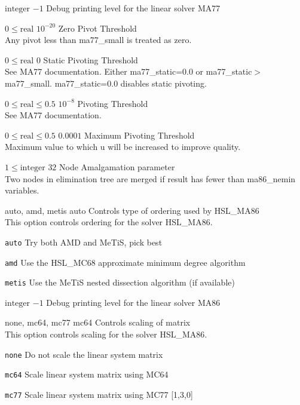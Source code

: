 %
{$\textrm{integer}$}%
{$-1$}%
{Debug printing level for the linear solver MA77}%
{}

%
{$0\leq\textrm{real}$}%
{$10^{-20}$}%
{Zero Pivot Threshold\\
Any pivot less than ma77\_small is treated as zero.}%
{}

%
{$0\leq\textrm{real}$}%
{$0$}%
{Static Pivoting Threshold\\
See MA77 documentation. Either ma77\_static=0.0 or ma77\_static$>$ma77\_small. ma77\_static=0.0 disables static pivoting.}%
{}

%
{$0\leq\textrm{real}\leq0.5$}%
{$10^{- 8}$}%
{Pivoting Threshold\\
See MA77 documentation.}%
{}

%
{$0\leq\textrm{real}\leq0.5$}%
{$0.0001$}%
{Maximum Pivoting Threshold\\
Maximum value to which u will be increased to improve quality.}%
{}

%
{$1\leq\textrm{integer}$}%
{$32$}%
{Node Amalgamation parameter\\
Two nodes in elimination tree are merged if result has fewer than ma86\_nemin variables.}%
{}

%
{\ttfamily auto, amd, metis}%
{auto}%
{Controls type of ordering used by HSL\_MA86\\
This option controls ordering for the solver HSL\_MA86.}%
{\begin{list}{}{
\setlength{\parsep}{0em}
\setlength{\leftmargin}{5ex}
\setlength{\labelwidth}{2ex}
\setlength{\itemindent}{0ex}
\setlength{\topsep}{0pt}}
\item[\texttt{auto}] Try both AMD and MeTiS, pick best
\item[\texttt{amd}] Use the HSL\_MC68 approximate minimum degree algorithm
\item[\texttt{metis}] Use the MeTiS nested dissection algorithm (if available)
\end{list}
}

%
{$\textrm{integer}$}%
{$-1$}%
{Debug printing level for the linear solver MA86}%
{}

%
{\ttfamily none, mc64, mc77}%
{mc64}%
{Controls scaling of matrix\\
This option controls scaling for the solver HSL\_MA86.}%
{\begin{list}{}{
\setlength{\parsep}{0em}
\setlength{\leftmargin}{5ex}
\setlength{\labelwidth}{2ex}
\setlength{\itemindent}{0ex}
\setlength{\topsep}{0pt}}
\item[\texttt{none}] Do not scale the linear system matrix
\item[\texttt{mc64}] Scale linear system matrix using MC64
\item[\texttt{mc77}] Scale linear system matrix using MC77 [1,3,0]
\end{list}
}

